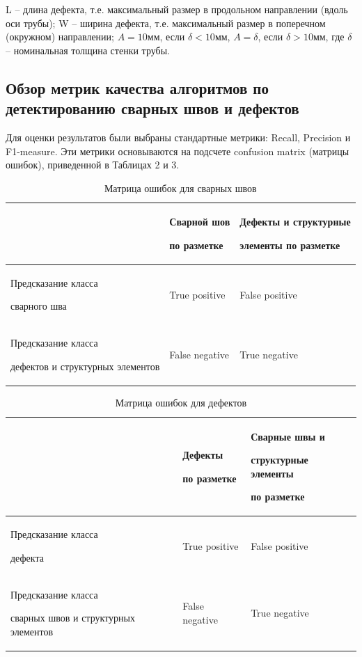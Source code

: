 \documentclass[a4paper,article,14pt]{extarticle}
\begin{document}
L – длина дефекта, т.е. максимальный размер в продольном направлении (вдоль оси трубы);
W – ширина дефекта, т.е. максимальный размер в поперечном (окружном) направлении;
$A = 10 мм$, если $\delta < 10 мм$, $A = \delta$, если $\delta > 10 мм$, где $\delta$ – номинальная толщина стенки трубы.

\subsection{Обзор метрик качества алгоритмов по детектированию сварных швов и дефектов}

Для оценки результатов были выбраны стандартные метрики: Recall,  Precision и F1-measure.
Эти метрики основываются на подсчете confusion matrix (матрицы ошибок), приведенной в Таблицах 2 и 3.

\begin{center}
\begin{longtable}{|p{5cm}|p{5cm}|p{6cm}|}
    \caption{Матрица ошибок для сварных швов}\\\hline
     & Сварной шов \par по разметке & Дефекты и структурные \par элементы по разметке \\ \hline
    Предсказание класса\par сварного шва & True positive & False positive \\ \hline
    Предсказание класса \par дефектов и структурных элементов & False negative & True negative \\ \hline
\end{longtable}
\end{center}

\pagebreak

\begin{center}
\begin{longtable}{|p{5cm}|p{5cm}|p{6cm}|}
    \caption{Матрица ошибок для дефектов}\\\hline
        & Дефекты \par по разметке & Сварные швы и \par структурные элементы \par по разметке \\ \hline
    Предсказание класса\par дефекта & True positive & False positive \\ \hline
    Предсказание класса \par сварных швов и структурных элементов & False negative & True negative \\ \hline
\end{longtable}
\end{center}
\end{document}
